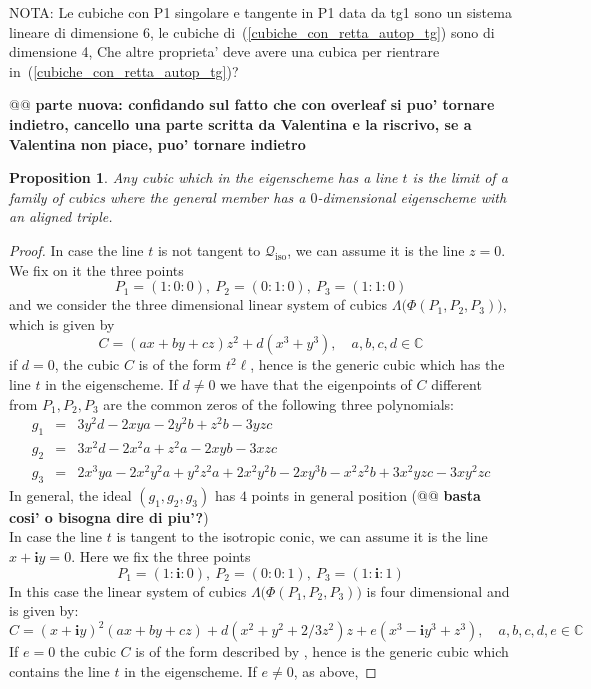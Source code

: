 \documentclass{amsart}
\theoremstyle{plain}
\newtheorem{prop}[lemma]{Proposition}
\theoremstyle{definition}
\newcommand{\C}{\mathbb{C}}
\newcommand{\iso}{\mathcal{Q}_{\mathrm{iso}}}
\newcommand{\iii}{\textbf{i}}
\begin{document}
NOTA: Le cubiche con P1 singolare e tangente in P1 data da tg1 sono
un sistema lineare di dimensione 6, le cubiche
di~(\ref{cubiche_con_retta_autop_tg}) sono di dimensione
4, Che altre proprieta' deve avere una cubica per rientrare
in~(\ref{cubiche_con_retta_autop_tg})?

\medskip
@@ \textbf{parte nuova: confidando sul fatto che con overleaf si puo' tornare indietro, cancello una parte scritta da Valentina e la riscrivo, se a Valentina non piace, puo' tornare indietro}

%
\begin{prop}
\label{prop:limitCubics}
Any cubic which in the eigenscheme has a line $t$ is the limit of a family of cubics where the general member has a $0$-dimensional eigenscheme with an aligned triple.
\end{prop}
\begin{proof}
In case the line $t$ is not tangent to $\iso$, we can assume it is the line $z=0$. We fix on it the three points 
\[
P_1= (1: 0: 0), \ P_2 = (0: 1: 0), \ P_3 = (1: 1: 0)
\]
and we consider the three dimensional linear system of 
cubics $\Lambda\bigl (\Phi(P_1, P_2, P_3) \bigr)$, which is given by
\[
C = (ax + by + cz)z^2+d(x^3+y^3), \quad a, b, c, d \in \C
\]
if $d=0$, the cubic $C$ is of the form $t^2\ell$, hence is the 
generic cubic which has the line $t$ in the eigenscheme. If $d \not= 0$
we have that the eigenpoints of $C$ different from $P_1, P_2, P_3$ are
the common zeros of the following three polynomials:
\begin{eqnarray*}
    g_1 & = & 3y^2d - 2xya - 2y^2b + z^2b - 3yzc\\
    g_2 & = & 3x^2d - 2x^2a + z^2a - 2xyb - 3xzc\\
    g_3 & = & 2x^3ya - 2x^2y^2a + y^2z^2a + 2x^2y^2b -
     2xy^3b - x^2z^2b + 3x^2yzc - 3xy^2zc
\end{eqnarray*}
In general, the ideal $(g_1, g_2, g_3)$ has $4$ points in 
general position (@@ \textbf{basta cosi' o bisogna dire di piu'?})\\
In case the line $t$ is tangent to the isotropic conic, we can 
assume it is the line $x+\iii y =0$. Here we fix the three
points
\[
P_1 = (1: \iii: 0), \ P_2 = (0: 0: 1), \ P_3 = (1: \iii: 1)
\]
In this case the linear system of cubics 
$\Lambda \bigl(\Phi(P_1, P_2, P_3)\bigr)$ is four dimensional and 
is given by:
\[
C = (x+\iii y)^2(ax + by+cz)+
 d(x^2 + y^2 + 2/3z^2)z+e (x^3 -\iii y^3 + z^3), 
 \quad a, b, c, d, e \in \C
\]
If $e=0$ the cubic $C$ is of the form described by , hence is the generic cubic which contains the line $t$ in the eigenscheme. If $e \not= 0$, as above, 

\end{proof}
\end{document}
